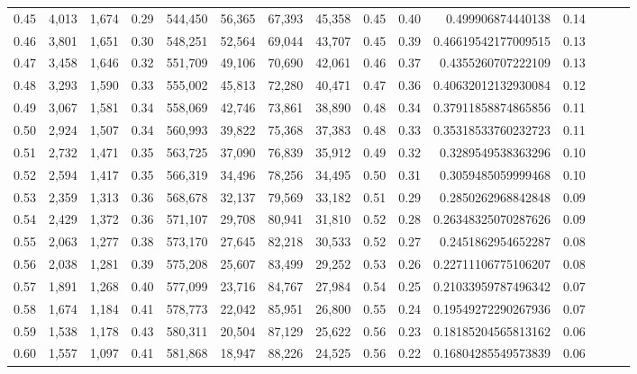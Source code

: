 \begin{tabular}{rrrrrrrrrrrrrrr}
0.45 &   4,013 &  1,674 &  0.29 &  544,450 &   56,365 &   67,393 &   45,358 &  0.45 &  0.40 &      0.499906874440138 &      0.14 \\
0.46 &   3,801 &  1,651 &  0.30 &  548,251 &   52,564 &   69,044 &   43,707 &  0.45 &  0.39 &    0.46619542177009515 &      0.13 \\
0.47 &   3,458 &  1,646 &  0.32 &  551,709 &   49,106 &   70,690 &   42,061 &  0.46 &  0.37 &     0.4355260707222109 &      0.13 \\
0.48 &   3,293 &  1,590 &  0.33 &  555,002 &   45,813 &   72,280 &   40,471 &  0.47 &  0.36 &    0.40632012132930084 &      0.12 \\
0.49 &   3,067 &  1,581 &  0.34 &  558,069 &   42,746 &   73,861 &   38,890 &  0.48 &  0.34 &    0.37911858874865856 &      0.11 \\
0.50 &   2,924 &  1,507 &  0.34 &  560,993 &   39,822 &   75,368 &   37,383 &  0.48 &  0.33 &    0.35318533760232723 &      0.11 \\
0.51 &   2,732 &  1,471 &  0.35 &  563,725 &   37,090 &   76,839 &   35,912 &  0.49 &  0.32 &     0.3289549538363296 &      0.10 \\
0.52 &   2,594 &  1,417 &  0.35 &  566,319 &   34,496 &   78,256 &   34,495 &  0.50 &  0.31 &     0.3059485059999468 &      0.10 \\
0.53 &   2,359 &  1,313 &  0.36 &  568,678 &   32,137 &   79,569 &   33,182 &  0.51 &  0.29 &     0.2850262968842848 &      0.09 \\
0.54 &   2,429 &  1,372 &  0.36 &  571,107 &   29,708 &   80,941 &   31,810 &  0.52 &  0.28 &    0.26348325070287626 &      0.09 \\
0.55 &   2,063 &  1,277 &  0.38 &  573,170 &   27,645 &   82,218 &   30,533 &  0.52 &  0.27 &     0.2451862954652287 &      0.08 \\
0.56 &   2,038 &  1,281 &  0.39 &  575,208 &   25,607 &   83,499 &   29,252 &  0.53 &  0.26 &    0.22711106775106207 &      0.08 \\
0.57 &   1,891 &  1,268 &  0.40 &  577,099 &   23,716 &   84,767 &   27,984 &  0.54 &  0.25 &    0.21033959787496342 &      0.07 \\
0.58 &   1,674 &  1,184 &  0.41 &  578,773 &   22,042 &   85,951 &   26,800 &  0.55 &  0.24 &    0.19549272290267936 &      0.07 \\
0.59 &   1,538 &  1,178 &  0.43 &  580,311 &   20,504 &   87,129 &   25,622 &  0.56 &  0.23 &    0.18185204565813162 &      0.06 \\
0.60 &   1,557 &  1,097 &  0.41 &  581,868 &   18,947 &   88,226 &   24,525 &  0.56 &  0.22 &    0.16804285549573839 &      0.06 \\

\end{tabular}
